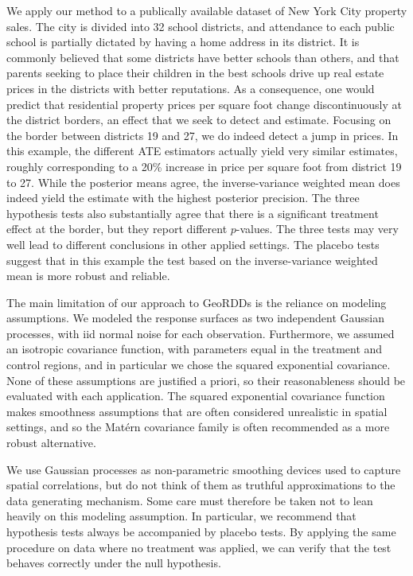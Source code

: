 \documentclass[letter]{article}
\begin{document}
    	We apply our method to a publically available dataset of New York City property sales.
The city is divided into 32 school districts, and attendance to each public school is partially dictated by having a home address in its district.
It is commonly believed that some districts have better schools than others, and that parents seeking to place their children in the best schools drive up real estate prices in the districts with better reputations.
As a consequence, one would predict that residential property prices per square foot change discontinuously at the district borders, an effect that we seek to detect and estimate.
Focusing on the border between districts 19 and 27, we do indeed detect a jump in prices.
In this example, the different ATE estimators actually yield very similar estimates, roughly corresponding to a 20\% increase in price per square foot from district 19 to 27.
While the posterior means agree, the inverse-variance weighted mean does indeed yield the estimate with the highest posterior precision.
The three hypothesis tests also substantially agree that there is a significant treatment effect at the border, but they report different \(p\)-values.
The three tests may very well lead to different conclusions in other applied settings.
The placebo tests suggest that in this example the test based on the inverse-variance weighted mean is more robust and reliable.
    


    	The main limitation of our approach to GeoRDDs is the reliance on modeling assumptions.
We modeled the response surfaces as two independent Gaussian processes, with iid normal noise for each observation.
Furthermore, we assumed an isotropic covariance function, with parameters equal in the treatment and control regions, and in particular we chose the squared exponential covariance.
None of these assumptions are justified a priori, so their reasonableness should be evaluated with each application.
The squared exponential covariance function makes smoothness assumptions that are often considered unrealistic in spatial settings, and so the Matérn covariance family is often recommended as a more robust alternative.

We use Gaussian processes as non-parametric smoothing devices used to capture spatial correlations, but do not think of them as truthful approximations to the data generating mechanism.
Some care must therefore be taken not to lean heavily on this modeling assumption.
In particular, we recommend that hypothesis tests always be accompanied by placebo tests.
By applying the same procedure on data where no treatment was applied, we can verify that the test behaves correctly under the null hypothesis.
\end{document}
